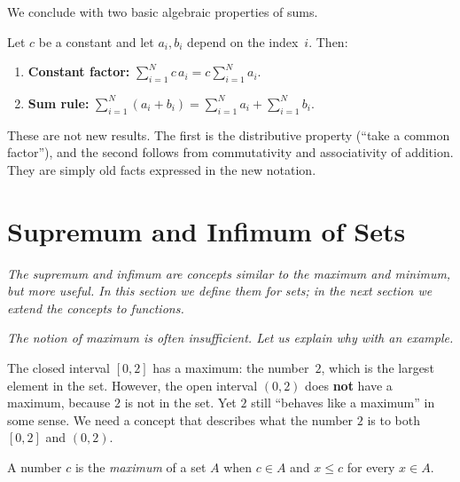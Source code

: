 We conclude with two basic algebraic properties of sums.

\begin{proposition}
\label{thm:7-1}
Let $c$ be a constant and let $a_i,b_i$ depend on the index~$i$.  Then:
\begin{enumerate}[label=(\roman*)]
  \item \textbf{Constant factor:} $\displaystyle\sum_{i=1}^{N} c\,a_i = c\sum_{i=1}^{N} a_i$.
  \item \textbf{Sum rule:} $\displaystyle\sum_{i=1}^{N}(a_i + b_i) = \sum_{i=1}^{N} a_i + \sum_{i=1}^{N} b_i$.
\end{enumerate}
\end{proposition}

\begin{remark}
These are not new results.  The first is the distributive property (``take a common factor''), and the second follows from commutativity and associativity of addition.  They are simply old facts expressed in the new notation.
\end{remark}

\section{Supremum and Infimum of Sets}
\label{sec:7.3}

\textit{The supremum and infimum are concepts similar to the maximum and minimum, but more useful.  In this section we define them for sets; in the next section we extend the concepts to functions.}

\textit{The notion of maximum is often insufficient.  Let us explain why with an example.}

\begin{example}
\label{ex:7-3}
The closed interval $[0,2]$ has a maximum: the number~$2$, which is the largest element in the set.  However, the open interval $(0,2)$ does \textbf{not} have a maximum, because $2$ is not in the set.  Yet $2$ still ``behaves like a maximum'' in some sense.  We need a concept that describes what the number $2$ is to both $[0,2]$ and $(0,2)$.
\end{example}

\begin{definition}[Maximum]
\label{def:7-2}
A number $c$ is the \emph{maximum} of a set $A$ when $c \in A$ and $x \le c$ for every $x \in A$.
\end{definition}

